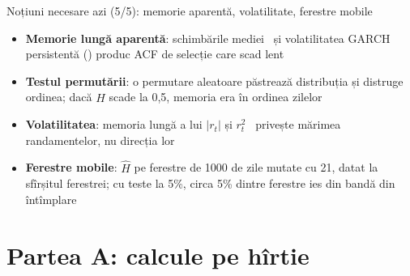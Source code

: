 \begin{frame}{Noțiuni necesare azi (5/5): memorie aparentă, volatilitate, ferestre mobile}
\itemsize{\small}
\begin{itemize}
    \item \textbf{Memorie lungă aparentă}: schimbările mediei \ și volatilitatea GARCH persistentă () produc ACF de selecție care scad lent
    \item \textbf{Testul permutării}: o permutare aleatoare păstrează distribuția și distruge ordinea; dacă $\hat H$ scade la 0,5, memoria era în ordinea zilelor
    \item \textbf{Volatilitatea}: memoria lungă a lui $|r_t|$ și $r_t^2$ \ privește mărimea randamentelor, nu direcția lor
    \item \textbf{Ferestre mobile}: $\hat H$ pe ferestre de 1000 de zile mutate cu 21, datat la sfîrșitul ferestrei; cu teste la 5\%, circa 5\% dintre ferestre ies din bandă din întîmplare
\end{itemize}
\end{frame}


\section{Partea A: calcule pe hîrtie}

